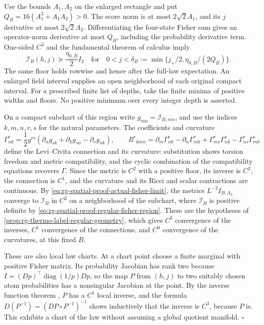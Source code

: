 Use the bounds \(A_1,A_2\) on the enlarged rectangle and put
\(Q_B=16(A_1^3+A_1A_2)>0\). The score norm is at most \(2\sqrt2A_1\), and
its \(j\) derivative at most \(2\sqrt2A_2\). Differentiating the four-state
Fisher sum gives an operator-norm derivative at most \(Q_B\), including the
probability derivative term. One-sided \(C^3\) and the fundamental theorem
of calculus imply
\begin{equation}
 \mathcal I_B(h,j)\succeq\frac{\eta_{0,B}}2I_2
 \quad\text{for}\quad
 0<j<\delta_B:=\min\{j_+/2,\eta_{0,B}/(2Q_B)\}.
 \label{eq:rg-spatial-proof-regular-fisher-region}
\end{equation}
The same floor holds rowwise and hence after the full-law expectation. An
enlarged field interval supplies an open neighborhood of each original
compact interval. For a prescribed finite list of depths, take the finite
minima of positive widths and floors. No positive minimum over every integer
depth is asserted.

On a compact subchart of this region write \(g_{mn}=\mathcal I_{B,mn}\), and
use the indices \(k,m,n,r,s\) for the natural parameters. The coefficients
and curvature
\begin{equation}
 \Gamma^r_{nk}=\frac12g^{rs}
        (\partial_ng_{sk}+\partial_kg_{sn}-\partial_sg_{nk}),\qquad
 R^r{}_{kmn}=\partial_m\Gamma^r_{nk}-\partial_n\Gamma^r_{mk}
             +\Gamma^r_{ms}\Gamma^s_{nk}-\Gamma^r_{ns}\Gamma^s_{mk}
 \label{eq:rg-spatial-proof-fisher-connection-curvature}
\end{equation}
define the Levi--Civita connection and its curvature: substitution shows
torsion freedom and metric compatibility, and the cyclic combination of the
compatibility equations recovers \(\Gamma\). Since the metric is \(C^2\)
with a positive floor, its inverse is \(C^2\), the connection is \(C^1\),
and the curvature and its Ricci and scalar contractions are continuous. By
\cref{eq:rg-spatial-proof-actual-fisher-limit}, the metrics
\(L^{-2}I_{B,\Lambda_L}\) converge to \(\mathcal I_B\) in \(C^2\) on a
neighborhood of the subchart, where \(\mathcal I_B\) is positive definite by
\cref{eq:rg-spatial-proof-regular-fisher-region}. These are the hypotheses
of \cref{prop:rg-thermo-label-regular-geometry}, which gives \(C^2\)
convergence of the inverses, \(C^1\) convergence of the connections, and
\(C^0\) convergence of the curvatures, at this fixed \(B\).

These are also local law charts. At a chart point choose a finite marginal
with positive Fisher matrix. Its probability Jacobian has rank two because
\(I=(Dp)^\top\operatorname{diag}(1/p)Dp\), so the map \(P\) from \((h,j)\)
to two suitably chosen atom probabilities has a nonsingular Jacobian at the
point. By the inverse function theorem \citep[Thm.~9.24]{Rudin1976}, \(P\)
has a \(C^1\) local inverse, and the formula
\(D(P^{-1})=(DP\circ P^{-1})^{-1}\) shows inductively that the inverse is
\(C^3\), because \(P\) is. This exhibits a chart of the law without
assuming a global quotient manifold. \hfill\(\square\)
